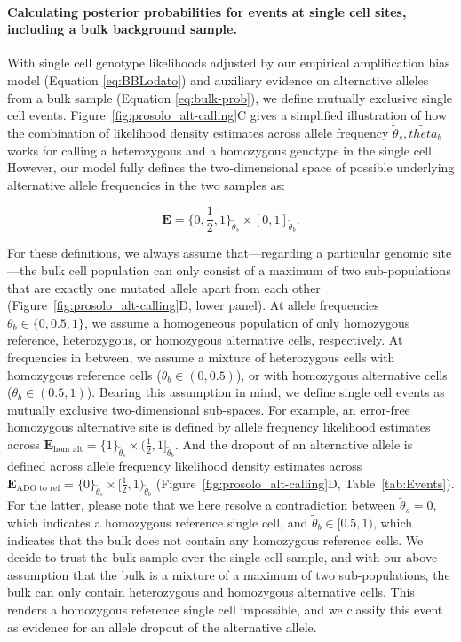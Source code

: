 \documentclass[12pt,inline]{wlscirep}
\begin{document}
\paragraph{Calculating posterior probabilities for events at single cell sites, including a bulk background sample.}
With single cell genotype likelihoods adjusted by our empirical amplification bias model (Equation \ref{eq:BBLodato}) and auxiliary evidence on alternative alleles from a bulk sample (Equation \ref{eq:bulk-prob}), we define mutually exclusive single cell events.
Figure~\ref{fig:prosolo_alt-calling}C gives a simplified illustration of how the combination of likelihood density estimates across allele frequency $\tilde{\theta}_s,\tilde{theta}_b$ works for calling a heterozygous and a homozygous genotype in the single cell.
However, our model fully defines the two-dimensional space of possible underlying alternative allele frequencies in the two samples as:

\begin{equation}
  \label{eq:event-space}
  \boldsymbol{E} =\{0, \frac{1}{2}, 1\}_{\tilde{\theta}_s} \times [0, 1]_{\tilde{\theta}_b}.
\end{equation}

For these definitions, we always assume that---regarding a particular genomic site---the bulk cell population can only consist of a maximum of two sub-populations that are exactly one mutated allele apart from each other (Figure~\ref{fig:prosolo_alt-calling}D, lower panel).
At allele frequencies $\theta_b \in \{0, 0.5, 1\}$, we assume a homogeneous population of only homozygous reference, heterozygous, or homozygous alternative cells, respectively.
At frequencies in between, we assume a mixture of heterozygous cells with homozygous reference cells ($\theta_b \in (0,0.5)$), or with homozygous alternative cells ($\theta_b \in (0.5,1)$).
Bearing this assumption in mind, we define single cell events as mutually exclusive two-dimensional sub-spaces.
For example, an error-free homozygous alternative site is defined by allele frequency likelihood estimates across $\boldsymbol{E}_{\text{hom alt}} = \{ 1 \}_{\tilde{\theta}_s} \times (\frac{1}{2}, 1]_{\tilde{\theta}_b}$.
And the dropout of an alternative allele is defined across allele frequency likelihood density estimates across $\boldsymbol{E}_{\text{ADO to ref}} = \{ 0 \}_{\tilde{\theta}_s} \times [\frac{1}{2}, 1)_{\tilde{\theta}_b}$ (Figure~\ref{fig:prosolo_alt-calling}D, Table~\ref{tab:Events}).
For the latter, please note that we here resolve a contradiction between $\tilde{\theta}_s = 0$, which indicates a homozygous reference single cell, and $\tilde{\theta}_b \in [0.5,1)$, which indicates that the bulk does not contain any homozygous reference cells.
We decide to trust the bulk sample over the single cell sample, and with our above assumption that the bulk is a mixture of a maximum of two sub-populations, the bulk can only contain heterozygous and homozygous alternative cells.
This renders a homozygous reference single cell impossible, and we classify this event as evidence for an allele dropout of the alternative allele.
\end{document}
